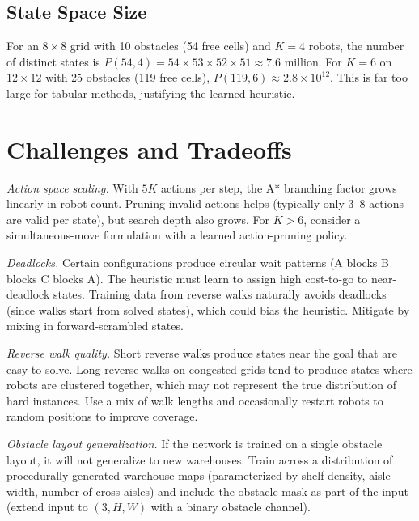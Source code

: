 \documentclass[11pt]{article}
\begin{document}
\subsection{State Space Size}

For an $8 \times 8$ grid with 10 obstacles (54 free cells) and $K = 4$ robots, the number of distinct states is $P(54, 4) = 54 \times 53 \times 52 \times 51 \approx 7.6$ million. For $K = 6$ on $12 \times 12$ with 25 obstacles (119 free cells), $P(119, 6) \approx 2.8 \times 10^{12}$. This is far too large for tabular methods, justifying the learned heuristic.

\section{Challenges and Tradeoffs}

\textit{Action space scaling.} With $5K$ actions per step, the A* branching factor grows linearly in robot count. Pruning invalid actions helps (typically only 3--8 actions are valid per state), but search depth also grows. For $K > 6$, consider a simultaneous-move formulation with a learned action-pruning policy.

\textit{Deadlocks.} Certain configurations produce circular wait patterns (A blocks B blocks C blocks A). The heuristic must learn to assign high cost-to-go to near-deadlock states. Training data from reverse walks naturally avoids deadlocks (since walks start from solved states), which could bias the heuristic. Mitigate by mixing in forward-scrambled states.

\textit{Reverse walk quality.} Short reverse walks produce states near the goal that are easy to solve. Long reverse walks on congested grids tend to produce states where robots are clustered together, which may not represent the true distribution of hard instances. Use a mix of walk lengths and occasionally restart robots to random positions to improve coverage.

\textit{Obstacle layout generalization.} If the network is trained on a single obstacle layout, it will not generalize to new warehouses. Train across a distribution of procedurally generated warehouse maps (parameterized by shelf density, aisle width, number of cross-aisles) and include the obstacle mask as part of the input (extend input to $(3, H, W)$ with a binary obstacle channel).
\end{document}
